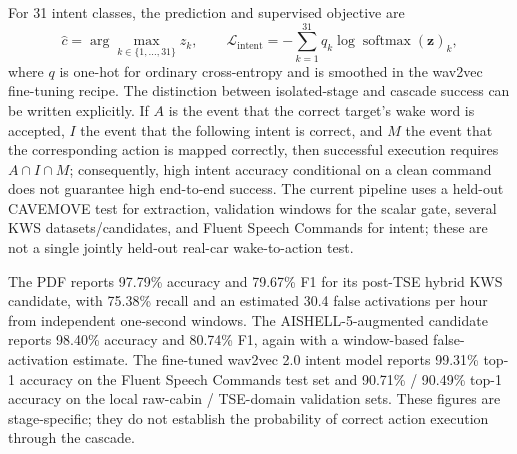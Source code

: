 For 31 intent classes, the prediction and supervised objective are
\begin{equation}
  \hat{c}=\arg\max_{k\in\{1,\ldots,31\}}z_k,\qquad
  \mathcal{L}_{\mathrm{intent}}=-\sum_{k=1}^{31}q_k\log\operatorname{softmax}(\mathbf{z})_k,
  \label{eq:intent}
\end{equation}
where $q$ is one-hot for ordinary cross-entropy and is smoothed in the wav2vec fine-tuning recipe. The distinction between isolated-stage and cascade success can be written explicitly. If $A$ is the event that the correct target's wake word is accepted, $I$ the event that the following intent is correct, and $M$ the event that the corresponding action is mapped correctly, then successful execution requires $A\cap I\cap M$; consequently, high intent accuracy conditional on a clean command does not guarantee high end-to-end success. The current pipeline uses a held-out CAVEMOVE test for extraction, validation windows for the scalar gate, several KWS datasets/candidates, and Fluent Speech Commands for intent; these are not a single jointly held-out real-car wake-to-action test.

The PDF reports 97.79\% accuracy and 79.67\% F1 for its post-TSE hybrid KWS candidate, with 75.38\% recall and an estimated 30.4 false activations per hour from independent one-second windows. The AISHELL-5-augmented candidate reports 98.40\% accuracy and 80.74\% F1, again with a window-based false-activation estimate. The fine-tuned wav2vec 2.0 intent model reports 99.31\% top-1 accuracy on the Fluent Speech Commands test set and 90.71\% / 90.49\% top-1 accuracy on the local raw-cabin / TSE-domain validation sets. These figures are stage-specific; they do not establish the probability of correct action execution through the cascade.

